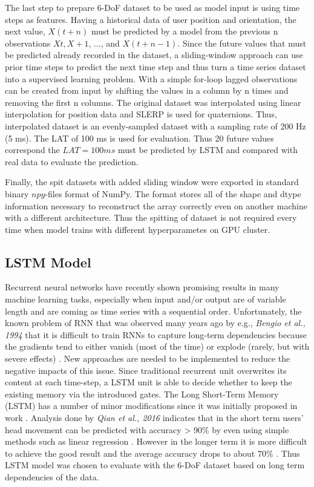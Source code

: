 The last step to prepare 6-DoF dataset to be used as model input is using time steps as features. Having a historical data of user position and orientation, the next value, $X(t+n)$ must be predicted by a model from the previous n observations $Xt, X+1$, ..., and $X(t+n-1)$. Since the future values that must be predicted already recorded in the dataset, a sliding-window approach can use prior time steps to predict the next time step and thus turn a time series dataset into a supervised learning problem. With a simple for-loop lagged observations can be created from input by shifting the values in a column by n times and removing the first n columns. The original dataset was interpolated using linear interpolation for position data and SLERP is used for quaternions. Thus, interpolated dataset is an evenly-sampled dataset with a sampling rate of 200 Hz (5 ms). The LAT of 100 ms is used for evaluation. Thus 20 future values correspond the $LAT = 100 ms$ must be predicted by LSTM and compared with real data to evaluate the prediction. 

Finally, the spit datasets with added sliding window were exported in standard binary $npy$-files format of NumPy. The format stores all of the shape and dtype information necessary to reconstruct the array correctly even on another machine with a different architecture. Thus the spitting of dataset is not required every time when model trains with different hyperparametes on GPU cluster.
 
\subsection{LSTM Model}
\label{sec:impl:model:arch:lstm}
Recurrent neural networks have recently shown promising results in many machine learning tasks, especially when input and/or output are of variable length and are coming as time series with a sequential order. Unfortunately, the known problem of RNN that was observed many years ago by e.g., \textit{Bengio et al., 1994} that it is difficult to train RNNs to capture long-term dependencies because the gradients tend to either vanish (most of the time) or explode (rarely, but with severe effects) \cite{rnn_difficults}. New approaches are needed to be implemented to reduce the negative impacts of this issue. Since traditional recurrent unit overwrites its content at each time-step, a LSTM unit is able to decide whether to keep the existing memory via the introduced gates. The Long Short-Term Memory (LSTM) has a number of minor modifications \cite{empirical_evaluation} since it was initially proposed in work \cite{lstm_orig}.
Analysis done by \textit{Qian et al., 2016} indicates that in the short term users’ head movement can be predicted with accuracy > 90\% by even using simple methods such as linear regression \cite{cellular_opt}. However in the longer term it is more difficult to achieve the good result and the average accuracy drops to about 70\% \cite{cellular_opt}. Thus LSTM model was chosen to evaluate with the 6-DoF dataset based on long term dependencies of the data. 

